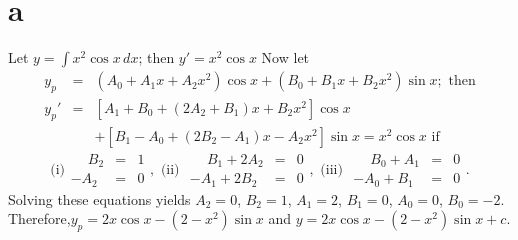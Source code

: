 \documentclass[dvips]{book}
\renewcommand{\exer}[1]{\par\medskip\;\noindent{\color{red}\bf #1.}}
\numberwithin{example}{section}
\numberwithin{equation}{section}
\numberwithin{theorem}{section}
\numberwithin{table}{section}
\numberwithin{figure}{section}
\begin{document}
\exer{5.5.40}
\part{a} Let $y=\int x^2\cos x\,dx$; then
$y'=x^2\cos x$ Now let
\begin{eqnarray*}
y_p&=&(A_0+A_1x+A_2x^2)\cos x +(B_0+B_1x+B_2x^2)\sin x;\mbox{ then}\\
y_p'&=&\left[A_1+B_0+(2A_2+B_1)x+B_2x^2\right]\cos x\\  &&
+\left[B_1-A_0+(2B_2-A_1)x-A_2x^2\right]\sin x
=x^2\cos x \mbox{ if}
\end{eqnarray*}
$$
\mbox{(i)}
\begin{array}{rcl} \phantom{-}B_2&=&1\\ -A_2&=&0 \end{array},
\mbox{ (ii) }
\begin{array}{rcl}
\phantom{-}B_1+2A_2&=&0\\ -A_1+2B_2&=&0\end{array},
\mbox{ (iii) }
\begin{array}{rcl} \phantom{-}B_0+A_1&=&0\\ -A_0+B_1&=&0
\end{array}.
$$
Solving these equations yields $A_2=0$, $B_2=1$, $A_1=2$, $B_1=0$,
$A_0=0$, $B_0=-2$. Therefore,$y_p=2x\cos x-(2-x^2)\sin x$ and
$y=2x\cos x-(2-x^2)\sin x+c$.
\end{document}
